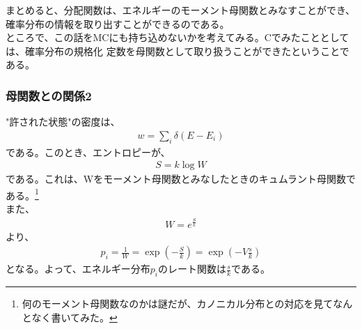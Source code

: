 \documentclass[a4paper,11pt]{jsarticle}
\numberwithin{equation}{section}
\begin{document}
まとめると、分配関数は、エネルギーのモーメント母関数とみなすことができ、確率分布の情報を取り出すことができるのである。\\ 

ところで、この話をMCにも持ち込めないかを考えてみる。Cでみたこととしては、確率分布の規格化
定数を母関数として取り扱うことができたということである。

\subsubsection{母関数との関係2}
"許された状態"の密度は、
\begin{align}
  w = \sum_{i}\delta(E-E_{i})
\end{align}
である。このとき、エントロピーが、
\begin{align}
  S = k\log W
\end{align}
である。これは、Wをモーメント母関数とみなしたときのキュムラント母関数である。\footnote{何のモーメント母関数なのかは謎だが、カノニカル分布との対応を見てなんとなく書いてみた。}\\
また、
\begin{align}
  W = e^{\frac{S}{k}}
\end{align}
より、
\begin{align}
  p_i = \frac{1}{W} = \exp(-\frac{S}{k}) = \exp(-V \frac{s}{k})
\end{align}
となる。よって、エネルギー分布$p_i$のレート関数は$\frac{s}{k}$である。\\
\end{document}
